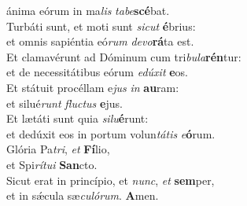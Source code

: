 \evenverse ánima eórum in ma\textit{lis} \textit{ta}\textit{be}\textbf{scé}bat.\\
\oddverse Turbáti sunt, et moti sunt \textit{si}\textit{cut} \textbf{é}brius:~\*\\
\oddverse et omnis sapiéntia eó\textit{rum} \textit{de}\textit{vo}\textbf{rá}ta est.\\
\evenverse Et clamavérunt ad Dóminum cum tri\textit{bu}\textit{la}\textbf{rén}tur:~\*\\
\evenverse et de necessitátibus eórum \textit{e}\textit{dú}\textit{xit} \textbf{e}os.\\
\oddverse Et státuit procéllam e\textit{jus} \textit{in} \textbf{au}ram:~\*\\
\oddverse et silué\textit{runt} \textit{flu}\textit{ctus} \textbf{e}jus.\\
\evenverse Et lætáti sunt quia \textit{si}\textit{lu}\textbf{é}runt:~\*\\
\evenverse et dedúxit eos in portum volun\textit{tá}\textit{tis} \textit{e}\textbf{ó}rum.\\
\oddverse Glória Pa\textit{tri}, \textit{et} \textbf{Fí}lio,~\*\\
\oddverse et Spi\textit{rí}\textit{tu}\textit{i} \textbf{San}cto.\\
\evenverse Sicut erat in princípio, et \textit{nunc}, \textit{et} \textbf{sem}per,~\*\\
\evenverse et in sǽcula sæ\textit{cu}\textit{ló}\textit{rum}. \textbf{A}men.\\
